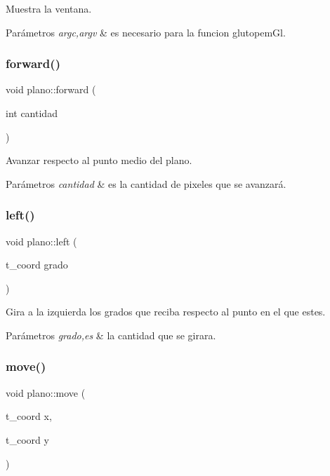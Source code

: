 Muestra la ventana. 
\begin{DoxyParams}{Parámetros}
{\em argc,argv} & es necesario para la funcion glutopem\+Gl. \\
\hline
\end{DoxyParams}
\mbox{\label{classplano_a2febab8f233098b881ced3f4553526f2}} 
\subsubsection{\texorpdfstring{forward()}{forward()}}
{\footnotesize\ttfamily void plano\+::forward (\begin{DoxyParamCaption}\item[{int}]{cantidad }\end{DoxyParamCaption})}

Avanzar respecto al punto medio del plano. 
\begin{DoxyParams}{Parámetros}
{\em cantidad} & es la cantidad de pixeles que se avanzará. \\
\hline
\end{DoxyParams}
\mbox{\label{classplano_ad5f11338792271b961051f7eff80c4cc}} 
\subsubsection{\texorpdfstring{left()}{left()}}
{\footnotesize\ttfamily void plano\+::left (\begin{DoxyParamCaption}\item[{t\+\_\+coord}]{grado }\end{DoxyParamCaption})}

Gira a la izquierda los grados que reciba respecto al punto en el que estes. 
\begin{DoxyParams}{Parámetros}
{\em grado,es} & la cantidad que se girara. \\
\hline
\end{DoxyParams}
\mbox{\label{classplano_a87e7fce6efc52d9b8c1e0c8946b1c2bb}} 
\subsubsection{\texorpdfstring{move()}{move()}}
{\footnotesize\ttfamily void plano\+::move (\begin{DoxyParamCaption}\item[{t\+\_\+coord}]{x,  }\item[{t\+\_\+coord}]{y }\end{DoxyParamCaption})}

